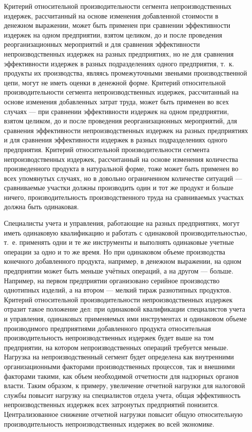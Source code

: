 \documentclass{article}
\begin{document}
Критерий относительной производительности сегмента непроизводственных издержек, рассчитанный на основе изменения добавленной стоимости в денежном выражении, может быть применен при сравнении эффективности издержек на одном предприятии, взятом целиком, до и после проведения реорганизационных мероприятий и для сравнения эффективности непроизводственных издержек на разных предприятиях, но не для сравнения эффективности издержек в разных подразделениях одного предприятия, т.~к. продукты их производства, являясь промежуточными звеньями производственной цепи, могут не иметь оценки в денежной форме. Критерий относительной производительности сегмента непроизводственных издержек, рассчитанный на основе изменения добавленных затрат труда, может быть применен во всех случаях — при сравнении эффективности издержек на одном предприятии, взятом целиком, до и после проведения реорганизационных мероприятий, для сравнения эффективности непроизводственных издержек на разных предприятиях и для сравнения эффективности издержек в разных подразделениях одного предприятия. Критерий относительной производительности сегмента непроизводственных издержек, рассчитанный на основе изменения количества произведенного продукта в натуральной форме, тоже может быть применен во всех упомянутых случаях, но в довольно ограниченном количестве ситуаций — сравниваемые участки должны производить один и тот же продукт и больше ничего, производительность производственного труда на сравниваемых участках должна быть одинаковая.

Специалисты учета и управления, работающие на разных предприятиях, могут иметь одинаковую квалификацию и работать с одинаковой производительностью, т.~е. применять одни и те же инструменты и выполнять одинаковые учетные операции за одно и то же время. Но при одинаковом объеме производства конечного добавленного продукта, например, в денежном выражении, на одном предприятии может быть меньше учётных операций, а на другом — больше. Например, на первом предприятии организовано серийное производство однотипных изделий, а на втором — мелкий тираж разнотипных продуктов. Критерий относительной производительности непроизводственных издержек отразит такое положение дел: при одинаковой квалификации специалистов учета и управления, одинаковых применяемых ими инструментах и одинаковом объеме производимого предприятиями добавленного продукта относительная производительность непроизводственных издержек будет выше на том предприятии, на котором непроизводственных операций требуется меньше. Нагрузка на непроизводственный сегмент будет определена как внутренними организационными факторами производственных процессов, так и внешними факторами такими, как объем необходимой отчетности для надзорных органов власти. Таким образом, к примеру, увеличение отчетной нагрузки для налоговой службы повысит нагрузку на специалистов отдела учета, общая эффективность непроизводственных издержек всех затронутых предприятий понизится. Централизованное снижение отчетной нагрузки повысит общую относительную производительность непроизводственных издержек во всей экономике.
\end{document}
